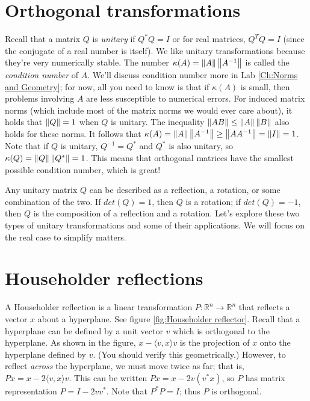 \label{Ch:Canonical Transformations}


\section*{Orthogonal transformations}
Recall that a matrix $Q$ is \emph{unitary} if $Q^* Q = I$ or for real matrices, $Q^T Q = I$ (since the conjugate of a real number is itself). We like unitary transformations because they're very numerically stable. The number $\kappa(A) = \left\lVert A\right\rVert \left\lVert A^{-1}\right\rVert$ is called the \emph{condition number} of $A$. We'll discuss condition number more in Lab \ref{Ch:Norms and Geometry}; for now, all you need to know is that if $\kappa(A)$ is small, then problems involving $A$ are less susceptible to numerical errors. For induced matrix norms (which include most of the matrix norms we would ever care about),  it holds that $\left\lVert Q\right\rVert=1$ when $Q$ is unitary. The inequality $\left\lVert AB\right\rVert \leq \left\lVert A\right\rVert \left\lVert B\right\rVert$ also holds for these norms. It follows that $\kappa(A) = \left\lVert A\right\rVert \left\lVert A^{-1}\right\rVert \geq \left\lVert A A^{-1}\right\rVert = \left\lVert I\right\rVert = 1$. Note that if $Q$ is unitary, $Q^{-1} = Q^*$ and $Q^*$ is also unitary, so $\kappa(Q) = \left\lVert Q\right\rVert \left\lVert Q^*\right\rVert = 1$. This means that orthogonal matrices have the smallest possible condition number, which is great!

Any unitary matrix $Q$ can be described as a reflection, a rotation, or some combination of the two. If $det(Q) = 1$, then $Q$ is a rotation; if $det(Q) = -1$, then $Q$  is the composition of a reflection and a rotation.  Let's explore these two types of unitary transformations and some of their applications. We will focus on the real case to simplify matters.

\section*{Householder reflections}
A Householder reflection is a linear transformation $P: \mathbb{R}^n \rightarrow \mathbb{R}^n$ that reflects a vector $x$ about a hyperplane. See figure \ref{fig:Householder reflector}. Recall that a hyperplane can be defined by a unit vector $v$ which is orthogonal to the hyperplane. As shown in the figure, $x - \langle v,x \rangle v$ is the projection of $x$ onto the hyperplane defined by $v$. (You should verify this geometrically.) However, to reflect \emph{across} the hyperplane, we must move twice as far; that is, $Px = x - 2\langle v,x \rangle v$. This can be written $Px = x - 2v(v^\ast x)$, so $P$ has matrix representation $P = I - 2vv^\ast$. Note that $P^\ast P = I$; thus $P$ is orthogonal.

